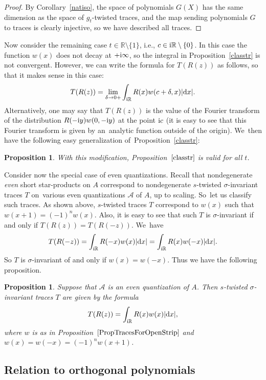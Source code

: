 \documentclass[10pt,a4paper]{amsart}
\newcommand{\RN}{\mathbb{R}} %
\newcommand{\mc}[1]{\mathcal{#1}}
\newtheorem{Proposition}[Theorem]{Proposition}
\theoremstyle{definition}
\numberwithin{equation}{section}
\begin{document}
\begin{proof}
By Corollary~\ref{natiso}, the space of polynomials $G(X)$ has the same dimension as the space of $g_t$-twisted traces, and the map sending polynomials $G$ to traces is clearly injective, so we have described all traces.
\end{proof}

Now consider the remaining case $t\in \mathbb R\setminus \lbrace 1\rbrace$, i.e., $c\in {\rm i}\mathbb R\setminus \lbrace 0\rbrace$. In this case the function $w(x)$ does not decay at $+{\rm i}\infty$, so the integral in Proposition~\ref{classtr} is not convergent. However, we can write the formula for $T(R(z))$ as follows, so that it makes sense in this case:
\[
T(R(z))=\lim_{\delta\to 0+}\int_{{\rm i}\RN} R(x)w(c+\delta,x)|{\rm d}x|.
\]
Alternatively, one may say that
$T(R(z))$ is the value of the Fourier transform of the distribution
$R(-{\rm i}y)w(0,-{\rm i}y)$ at the point ${\rm i}c$ (it is easy to see that this Fourier transform is given by an~analytic function outside of the origin). We~then have the following easy generalization of~Proposition~\ref{classtr}:

\begin{Proposition} With this modification, Proposition~$\ref{classtr}$ is valid for all $t$.
\end{Proposition}

Consider now the special case of even quantizations.
Recall \cite[Section~3.3]{ES} that nondegenerate {\it even} short star-products on $A$ correspond to nondegenerate $s$-twisted $\sigma$-invariant traces $T$ on~various even quantizations $\mc A$ of $A$, up to scaling. So~let us classify such traces. As shown above, $s$-twisted traces $T$ correspond to $w(x)$ such that $w(x+1)=(-1)^n w(x)$. Also, it is easy to see that such $T$ is $\sigma$-invariant if and only if $T(R(z))=T(R(-z))$. We~have
\[
T(R(-z))=\int_{{\rm i}\RN} R(-x)w(x) |{\rm d}x|=\int_{{\rm i}\RN} R(x)w(-x) |{\rm d}x|.
\]
So $T$ is $\sigma$-invariant of and only if $w(x)=w(-x)$. Thus we have the following proposition.

\begin{Proposition}
Suppose that $\mc{A}$ is an even quantization of $A$. Then $s$-twisted $\sigma$-invariant traces $T$ are given by the formula
\[
T(R(z))=\int_{{\rm i}\RN} R(x)w(x)|{\rm d}x|,
\]
where $w$ is as in Proposition~$\ref{PropTracesForOpenStrip}$ and
$w(x)=w(-x)=(-1)^n w(x+1)$.
\end{Proposition}

\subsection{Relation to orthogonal polynomials}\label{ortpol}
\end{document}
